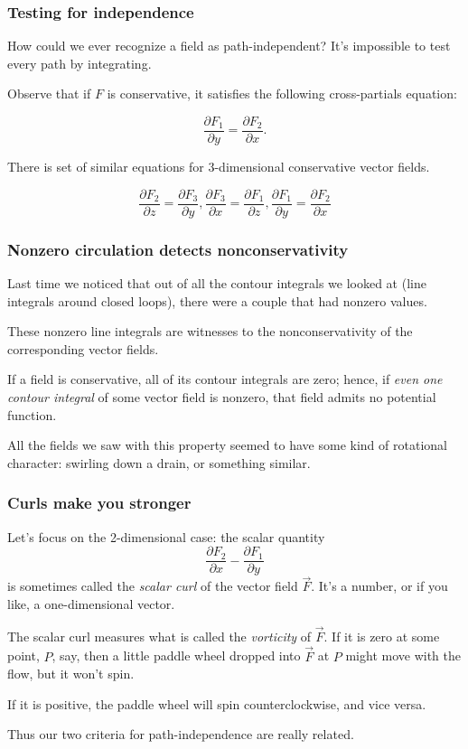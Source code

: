 \documentclass[11pt,ignorenonframetext,aspectratio=169,xcolor={svgnames}]{beamer}
\begin{document}
\begin{frame}\frametitle{Testing for independence}

How could we ever recognize a field as path-independent? It's impossible
to test every path by integrating.

Observe that if $F$ is conservative, it satisfies the following
cross-partials equation:

\[ \frac{\partial F_1}{\partial y} = \frac{\partial F_2}{\partial x}. \]

There is set of similar equations for 3-dimensional conservative vector
fields.

\[ \frac{\partial F_2}{\partial z} = \frac{\partial F_3}{\partial y}, \frac{\partial F_3}{\partial x} = \frac{\partial F_1}{\partial z}, \frac{\partial F_1}{\partial y} = \frac{\partial F_2}{\partial x} \]

\end{frame}

\begin{frame}\frametitle{Nonzero circulation detects nonconservativity}

Last time we noticed that out of all the contour integrals we looked at
(line integrals around closed loops), there were a couple that had
nonzero values.

These nonzero line integrals are witnesses to the nonconservativity of
the corresponding vector fields.

If a field is conservative, all of its contour integrals are zero;
hence, if \emph{even one contour integral} of some vector field is
nonzero, that field admits no potential function.

All the fields we saw with this property seemed to have some kind of
rotational character: swirling down a drain, or something similar.

\end{frame}

\begin{frame}\frametitle{Curls make you stronger}

Let's focus on the 2-dimensional case: the scalar quantity
\[ \frac{\partial F_2}{\partial x} - \frac{\partial F_1}{\partial y} \]
is sometimes called the \emph{scalar curl} of the vector field
$\vec{F}$. It's a number, or if you like, a one-dimensional vector.

The scalar curl measures what is called the \emph{vorticity} of
$\vec{F}$. If it is zero at some point, $P$, say, then a little paddle
wheel dropped into $\vec{F}$ at $P$ might move with the flow, but it
won't spin.

If it is positive, the paddle wheel will spin counterclockwise, and vice
versa.

Thus our two criteria for path-independence are really related.

\end{frame}
\end{document}
